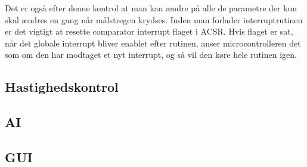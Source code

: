 Det er også efter denne kontrol at man kan ændre på alle de parametre der kun skal ændres en gang når målstregen krydses. Inden man forlader interruptrutinen er det vigtigt at resette comparator interrupt flaget i ACSR. Hvis flaget er sat, når det globale interrupt bliver enablet efter rutinen, anser microcontrolleren det som om den har modtaget et nyt interrupt, og så vil den køre hele rutinen igen.

\subsection{Hastighedskontrol}


\subsection{AI}

\subsection{GUI}
